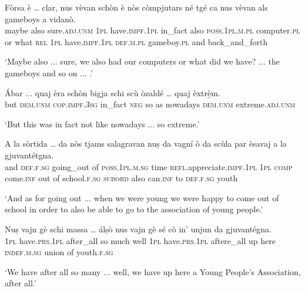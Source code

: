 \largerpage[2]

\begin{linenumbers}
	\gll Fòrsa è … clar, nus vèvan schòn è nòs còmpjutars né tgé ca nus vèvan als gameboys a vidanò.    \\
	maybe also {} sure.\textsc{adj.unm} \textsc{1pl} have.\textsc{impf.1pl} in\_fact also \textsc{poss.1pl.m.pl} computer.\textsc{pl} or what \textsc{rel} \textsc{1pl} have.\textsc{impf.1pl} \textsc{def.m.pl} gameboy.\textsc{pl} and back\_and\_forth \\
\end{linenumbers}
\medskip
\glt `Maybe also ... sure, we also had our computers or what did we have? ... the gameboys and so on ... .'
\smallskip

\begin{linenumbers}
	\gll  Ábar ... quaj èra schòn bigja schi scù òzaldé … quaj èxtrè̱m.   \\
	but {} \textsc{dem.unm} \textsc{cop.impf.3sg} in\_fact \textsc{neg} so as nowadays {} \textsc{dem.unm} extreme.\textsc{adj.unm}\\
\end{linenumbers}
\smallskip
\glt `But this was in fact not like nowadays ... so extreme.'
\clearpage

\begin{linenumbers}
	\gll A la sòrtida … da nòs tjams salagravan nuṣ da vagní ò da scùla par èsavaj a la gjuvantétgna.\\
	and \textsc{def.f.sg} going\_out {} of \textsc{ poss.1pl.m.sg} time \textsc{refl}.appreciate.\textsc{impf.1pl} \textsc{1pl} \textsc{comp} come.\textsc{inf} out of school.\textsc{f.sg} \textsc{subord} also can.\textsc{inf} to \textsc{def.f.sg} youth\\
\end{linenumbers}
\medskip
\glt `And as for going out ... when we were young we were happy to come out of school in order to also be able to go to the association of young people.'
\medskip

\begin{linenumbers}
	\gll Nuṣ vajn gè schi massa … álṣò nus vajn gè sé cò in’ unjun da gjuvantégna. \\
\textsc{1pl} have.\textsc{prs.1pl} after\_all so much {} well \textsc{1pl} have.\textsc{prs.1pl} aftere\_all up here \textsc{indef.m.sg} union of youth.\textsc{f.sg}	\\
\end{linenumbers}
\medskip
\glt `We have after all so many ... well, we have up here a Young People's Association, after all.'
\medskip




